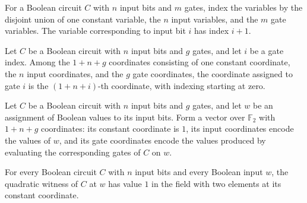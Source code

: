 \begin{definition}
\label{FABL.BooleanCircuit.circuitQuadraticInputIndex}
\leanok
{}
For a Boolean circuit $C$ with $n$ input bits and $m$ gates, index the variables by the
disjoint union of one constant variable, the $n$ input variables, and the $m$ gate
variables. The variable corresponding to input bit $i$ has index $i+1$.
\end{definition}

\begin{definition}
\label{FABL.BooleanCircuit.circuitQuadraticGateIndex}
\leanok
{}
Let $C$ be a Boolean circuit with $n$ input bits and $g$ gates, and let $i$ be a gate
index. Among the $1+n+g$ coordinates consisting of one constant coordinate, the $n$
input coordinates, and the $g$ gate coordinates, the coordinate assigned to gate $i$ is
the $(1+n+i)$-th coordinate, with indexing starting at zero.
\end{definition}

\begin{definition}
\label{FABL.BooleanCircuit.circuitQuadraticWitness}
\leanok
{}
Let $C$ be a Boolean circuit with $n$ input bits and $g$ gates, and let $w$ be an
assignment of Boolean values to its input bits. Form a vector over $\mathbb{F}_2$ with
$1+n+g$ coordinates: its constant coordinate is $1$, its input coordinates encode the
values of $w$, and its gate coordinates encode the values produced by evaluating the
corresponding gates of $C$ on $w$.
\end{definition}

\begin{theorem}
\label{FABL.BooleanCircuit.circuitQuadraticWitness_constant}
\leanok
{}
For every Boolean circuit $C$ with $n$ input bits and every Boolean input $w$, the
quadratic witness of $C$ at $w$ has value $1$ in the field with two elements at its
constant coordinate.
\end{theorem}

